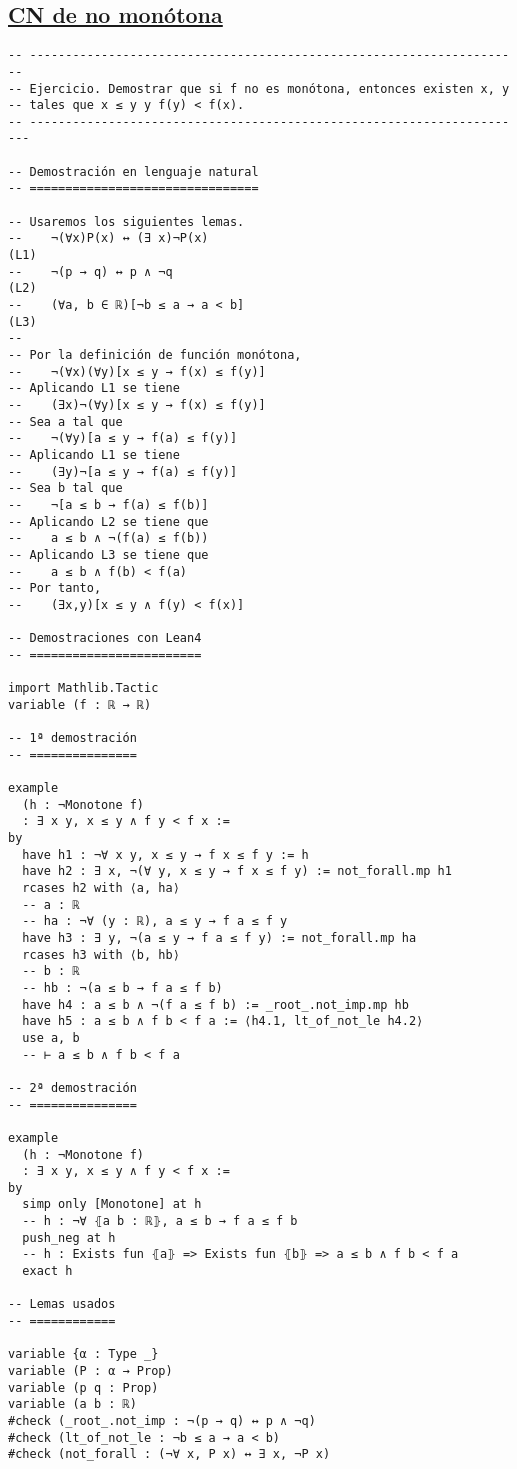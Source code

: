 \subsection{\href{./src/Logica/CN\_de\_no\_monotona.lean}{CN de no monótona}}
\label{sec:orgffa9367}
\begin{verbatim}
-- ---------------------------------------------------------------------
-- Ejercicio. Demostrar que si f no es monótona, entonces existen x, y
-- tales que x ≤ y y f(y) < f(x).
-- ----------------------------------------------------------------------

-- Demostración en lenguaje natural
-- ================================

-- Usaremos los siguientes lemas.
--    ¬(∀x)P(x) ↔ (∃ x)¬P(x)                                         (L1)
--    ¬(p → q) ↔ p ∧ ¬q                                              (L2)
--    (∀a, b ∈ ℝ)[¬b ≤ a → a < b]                                    (L3)
--
-- Por la definición de función monótona,
--    ¬(∀x)(∀y)[x ≤ y → f(x) ≤ f(y)]
-- Aplicando L1 se tiene
--    (∃x)¬(∀y)[x ≤ y → f(x) ≤ f(y)]
-- Sea a tal que
--    ¬(∀y)[a ≤ y → f(a) ≤ f(y)]
-- Aplicando L1 se tiene
--    (∃y)¬[a ≤ y → f(a) ≤ f(y)]
-- Sea b tal que
--    ¬[a ≤ b → f(a) ≤ f(b)]
-- Aplicando L2 se tiene que
--    a ≤ b ∧ ¬(f(a) ≤ f(b))
-- Aplicando L3 se tiene que
--    a ≤ b ∧ f(b) < f(a)
-- Por tanto,
--    (∃x,y)[x ≤ y ∧ f(y) < f(x)]

-- Demostraciones con Lean4
-- ========================

import Mathlib.Tactic
variable (f : ℝ → ℝ)

-- 1ª demostración
-- ===============

example
  (h : ¬Monotone f)
  : ∃ x y, x ≤ y ∧ f y < f x :=
by
  have h1 : ¬∀ x y, x ≤ y → f x ≤ f y := h
  have h2 : ∃ x, ¬(∀ y, x ≤ y → f x ≤ f y) := not_forall.mp h1
  rcases h2 with ⟨a, ha⟩
  -- a : ℝ
  -- ha : ¬∀ (y : ℝ), a ≤ y → f a ≤ f y
  have h3 : ∃ y, ¬(a ≤ y → f a ≤ f y) := not_forall.mp ha
  rcases h3 with ⟨b, hb⟩
  -- b : ℝ
  -- hb : ¬(a ≤ b → f a ≤ f b)
  have h4 : a ≤ b ∧ ¬(f a ≤ f b) := _root_.not_imp.mp hb
  have h5 : a ≤ b ∧ f b < f a := ⟨h4.1, lt_of_not_le h4.2⟩
  use a, b
  -- ⊢ a ≤ b ∧ f b < f a

-- 2ª demostración
-- ===============

example
  (h : ¬Monotone f)
  : ∃ x y, x ≤ y ∧ f y < f x :=
by
  simp only [Monotone] at h
  -- h : ¬∀ ⦃a b : ℝ⦄, a ≤ b → f a ≤ f b
  push_neg at h
  -- h : Exists fun ⦃a⦄ => Exists fun ⦃b⦄ => a ≤ b ∧ f b < f a
  exact h

-- Lemas usados
-- ============

variable {α : Type _}
variable (P : α → Prop)
variable (p q : Prop)
variable (a b : ℝ)
#check (_root_.not_imp : ¬(p → q) ↔ p ∧ ¬q)
#check (lt_of_not_le : ¬b ≤ a → a < b)
#check (not_forall : (¬∀ x, P x) ↔ ∃ x, ¬P x)
\end{verbatim}

